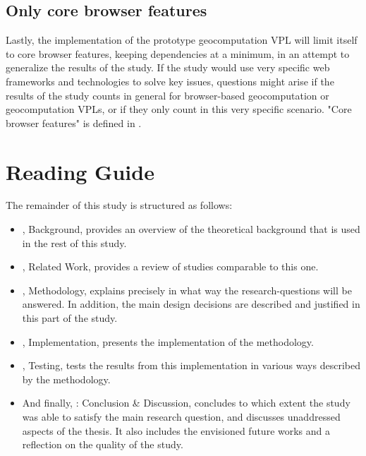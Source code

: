 \subsection*{Only core browser features}
Lastly, the implementation of the prototype geocomputation VPL will limit itself to core browser features, keeping dependencies at a minimum, in an attempt to generalize the results of the study.
If the study would use very specific web frameworks and technologies to solve key issues, questions might arise if the results of the study counts in general for browser-based geocomputation or geocomputation VPLs, or if they only count in this very specific scenario. 
"Core browser features" is defined in .

\newpage


\section{Reading Guide}
The remainder of this study is structured as follows:


\begin{itemize}[ ]
  \item {}, Background, provides an overview of the theoretical background that is used in the rest of this study.
  
  \item {}, Related Work, provides a review of studies comparable to this one.

  \item {}, Methodology, explains precisely in what way the research-questions will be answered.
  In addition, the main design decisions are described and justified in this part of the study.

  \item {}, Implementation, presents the implementation of the methodology.
  
  \item {}, Testing, tests the results from this implementation in various ways described by the methodology.
  
  \item And finally, : Conclusion \& Discussion, concludes to which extent the study was able to satisfy the main research question, and discusses unaddressed aspects of the thesis.
  It also includes the envisioned future works and a reflection on the quality of the study.

\end{itemize}